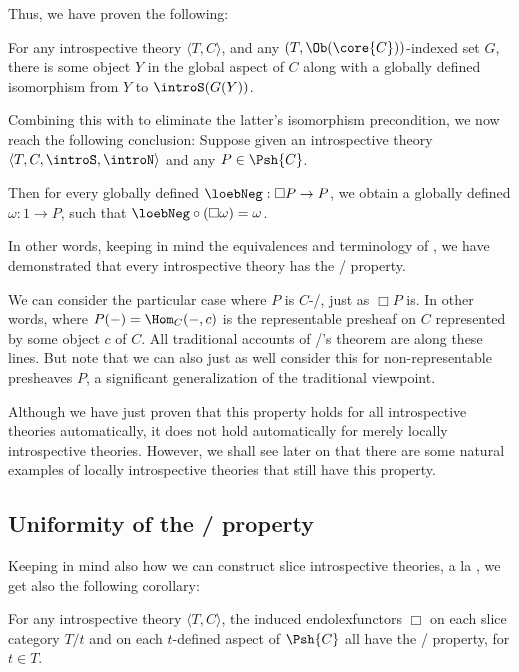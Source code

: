 Thus, we have proven the following:
\begin{theorem}\label{IntrospTyConFixedPoints}
For any introspective theory $\langle T, C \rangle$, and any  $(T, \Ob(\core{C}))$-indexed set $G$, there is some object $Y$ in the global aspect of $C$ along with a globally defined isomorphism from $Y$ to $\introS(G(Y))$.
\end{theorem}

Combining this with  to eliminate the latter's isomorphism precondition, we now reach the following conclusion:
\label{IntrospLoeb}
Suppose given an introspective theory $\langle T, C, \introS, \introN \rangle$ and any $P \in \Psh{C}$.

Then for every globally defined $\loebNeg : \Box P \to P$, we obtain a globally defined $\omega : 1 \to P$, such that $\loebNeg \circ (\Box \omega) = \omega$.

In other words, keeping in mind the equivalences and terminology of , we have demonstrated that every introspective theory has the \Loeb/ property.

We can consider the particular case where $P$ is $C$-\repsmall/, just as $\Box P$ is. In other words, where $P(-) = \Hom_C(-, c)$ is the representable presheaf on $C$ represented by some object $c$ of $C$. All traditional accounts of \Loeb/'s theorem are along these lines. But note that we can also just as well consider this  for non-representable presheaves $P$, a significant generalization of the traditional viewpoint.

Although we have just proven that this property holds for all introspective theories automatically, it does not hold automatically for merely locally introspective theories.  However, we shall see later on that there are some natural examples of locally introspective theories that still have this property. 

\subsection{Uniformity of the \Loeb/ property}
Keeping in mind also how we can construct slice introspective theories, a la , we get also the following corollary:
\begin{corollary}\label{IntrospTransfersEverywhere}
For any introspective theory $\langle T, C \rangle$, the induced endolexfunctors $\Box$ on each slice category $T/t$ and on each $t$-defined aspect of $\Psh{C}$ all have the \Loeb/ property, for $t \in T$.
\end{corollary}

